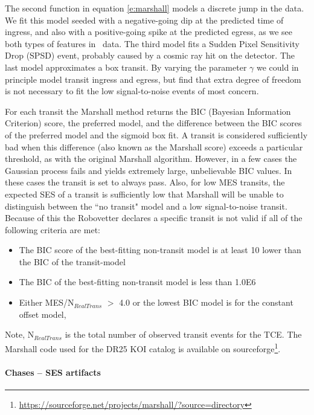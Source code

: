The second function in equation \ref{e:marshall} models a discrete jump in the data. We fit this model seeded with a negative-going dip at the predicted time of ingress, and also with a positive-going spike at the predicted egress, as we see both types of features in \Kepler\ data. The third model fits a Sudden Pixel Sensitivity Drop (SPSD) event, probably caused by a cosmic ray hit on the detector. The last model approximates a box transit. By varying the parameter $\gamma$ we could in principle model transit ingress and egress, but find that extra degree of freedom is not necessary to fit the low signal-to-noise events of most concern.

For each transit the Marshall method returns the BIC (Bayesian Information Criterion) score, the preferred model, and the difference between the BIC scores of the preferred model and the sigmoid box fit.  A transit is considered sufficiently bad when this difference (also known as the Marshall score) exceeds a particular threshold, as with the original Marshall algorithm.  However, in a few cases the Gaussian process fails and yields extremely large, unbelievable BIC values. In these cases the transit is set to always pass.  Also, for low MES transits, the expected SES of a transit is sufficiently low that Marshall will be unable to distinguish between the ``no transit" model and a low signal-to-noise transit.  Because of this the Robovetter declares a specific transit is not valid if all of the following criteria are met:

\begin{itemize}
\item The BIC score of the best-fitting non-transit model is at least 10 lower than the BIC of the transit-model
\item The BIC of the best-fitting non-transit model is less than 1.0E6
\item Either MES/N$_{RealTrans}$ $>$ 4.0 or the lowest BIC model is for the constant offset model, 
\end{itemize}

Note, N$_{RealTrans}$ is the total number of observed transit events for the TCE. The Marshall code used for the DR25 KOI catalog is available on sourceforge\footnote{ \url{https://sourceforge.net/projects/marshall/?source=directory}}.


\paragraph{Chases -- SES artifacts}
\label{s:chases}

